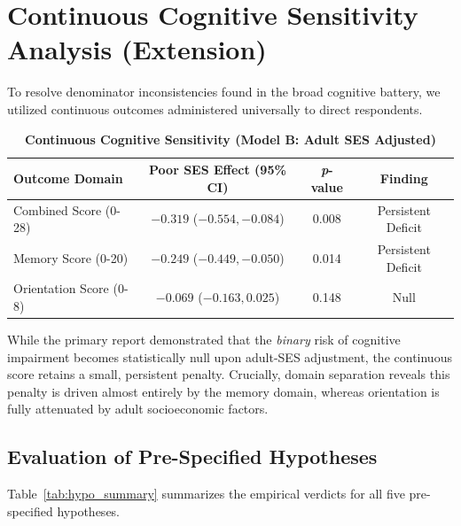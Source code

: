 \documentclass[11pt,a4paper]{article}
\begin{document}
\section{Continuous Cognitive Sensitivity Analysis (Extension)}
To resolve denominator inconsistencies found in the broad cognitive battery, we utilized continuous outcomes administered universally to direct respondents.

\begin{table}[H]
\centering
\small
\caption{\textbf{Continuous Cognitive Sensitivity (Model B: Adult SES Adjusted)}}
\begin{tabular}{lccc}
\toprule
\textbf{Outcome Domain} & \textbf{Poor SES Effect (95\% CI)} & \textbf{\textit{p}-value} & \textbf{Finding} \\
\midrule
Combined Score (0-28) & $-0.319$ ($-0.554, -0.084$) & 0.008 & Persistent Deficit \\
Memory Score (0-20) & $-0.249$ ($-0.449, -0.050$) & 0.014 & Persistent Deficit \\
Orientation Score (0-8) & $-0.069$ ($-0.163, 0.025$) & 0.148 & Null \\
\bottomrule
\end{tabular}
\end{table}

While the primary report demonstrated that the \textit{binary} risk of cognitive impairment becomes statistically null upon adult-SES adjustment, the continuous score retains a small, persistent penalty. Crucially, domain separation reveals this penalty is driven almost entirely by the memory domain, whereas orientation is fully attenuated by adult socioeconomic factors.

\subsection{Evaluation of Pre-Specified Hypotheses}
Table~\ref{tab:hypo_summary} summarizes the empirical verdicts for all five pre-specified hypotheses.
\end{document}
